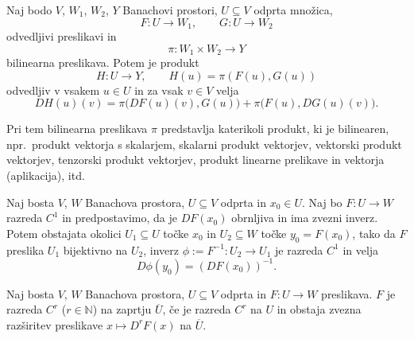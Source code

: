 \begin{izrek}
	Naj bodo $V$, $W_1$, $W_2$, $Y$ Banachovi prostori,
	$U\subseteq V$ odprta množica,
	\[
		F\colon U\to W_1,\qquad G\colon U\to W_2
	\]
	odvedljivi preslikavi in
	\[ \pi\colon W_1\times W_2\to Y \]
	bilinearna preslikava. Potem je produkt
	\[
		H\colon U\to Y, \qquad H(u)=\pi(F(u),G(u))
	\]
	odvedljiv v vsakem $u\in U$ in za vsak $v\in V$ velja
	\[
		DH(u)(v)=\pi\big(DF(u)(v),G(u)\big)+\pi\big(F(u),DG(u)(v)\big).
	\]
\end{izrek}
Pri tem bilinearna preslikava $\pi$ predstavlja katerikoli produkt, ki je bilinearen,
npr.~produkt vektorja s skalarjem, skalarni produkt vektorjev, vektorski produkt vektorjev,
tenzorski produkt vektorjev, produkt linearne prelikave in vektorja (aplikacija), itd.

\begin{izrek}
	Naj bosta $V$, $W$ Banachova prostora, $U\subseteq V$ odprta in $x_0\in U$. Naj bo
	$F\colon U\to W$ razreda $C^1$ in predpostavimo, da je $DF(x_0)$ obrnljiva in
	ima zvezni inverz. Potem obstajata okolici $U_1\subseteq U$ točke $x_0$ in
	$U_2\subseteq W$ točke $y_0=F(x_0)$, tako da $F$ preslika $U_1$ bijektivno na
	$U_2$, inverz $\phi:=F^{-1}\colon U_2\to U_1$ je razreda $C^1$ in velja
	\[ D\phi(y_0)=(DF(x_0))^{-1}. \]
\end{izrek}

\begin{definicija}
	Naj bosta $V$, $W$ Banachova prostora, $U\subseteq V$ odprta in $F\colon U\to W$ preslikava. 
	$F$ je razreda $C^r$ ($r\in\mathbb{N}$) na zaprtju $\overline{U}$, če je razreda $C^r$ na $U$ in
	obstaja zvezna razširitev preslikave $x\mapsto D^rF(x)$ na $\overline{U}$.
\end{definicija}

\begin{comment}
Naj bosta $(V_1,\|\cdot\|_1)$, $(V_2,\|\cdot\|_2)$ Banachova prostora. $V=V_1\times V_2$
je vektorski prostor, z ustrezno definirano normo $\|\cdot\|_V$, porojeno iz norm $\|\cdot\|_1$ in $\|\cdot\|_2$,
pa postane Banachov prostor. Naj bo $F\colon U\to W$, kjer je $U\subseteq V$ odprta množica, in naj bosta
\[ U_1=\{x\in V_1\;;\ (x,y_0)\in U\}\quad\textrm{ter}\quad U_2=\{y\in V_2\;;\ (x_0,y)\in U\}. \]
Če v točki $(x_0,y_0)\in U$ obstajata
\begin{itemize}
\item odvod preslikave $F(\cdot,y_0)\colon U_1\to W$, ki ga označimo z $\partial_1 F(x_0,y_0)$ in
\item odvod preslikave $F(x_0,\cdot)\colon U_2\to W$, ki ga označimo z $\partial_2 F(x_0,y_0)$
\end{itemize}
in sta oba zvezna, potem je $F$ odvedljiva v $(x_0,y_0)$ in velja
\[ DF(x_0,y_0)(u,v)=\partial_1 F(x_0,y_0)(u)+\partial_2 F(x_0,y_0)(v). \]
\end{comment}


